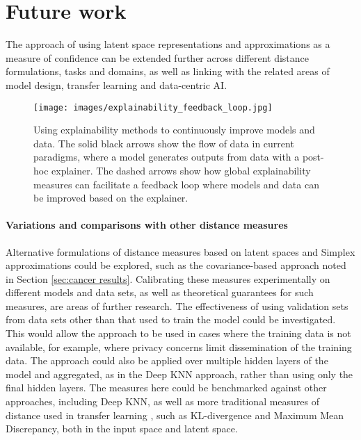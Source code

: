 \documentclass{article}
\begin{document}
\section{Future work}
\label{sec:future work}

The approach of using latent space representations and approximations as a measure of confidence can be extended further across different distance formulations, tasks and domains, as well as linking with the related areas of model design, transfer learning and data-centric AI.

\begin{figure}[ht]
  \centering
  \texttt{[image: images/explainability\_feedback\_loop.jpg]}
  \caption{Using explainability methods to continuously improve models and data. The solid black arrows show the flow of data in current paradigms, where a model generates outputs from data with a post-hoc explainer. The dashed arrows show how global explainability measures can facilitate a feedback loop where models and data can be improved based on the explainer.}
  \label{explainability_loop}
\end{figure}


\paragraph{Variations and comparisons with other distance measures}
Alternative formulations of distance measures based on latent spaces and Simplex approximations could be explored, such as the covariance-based approach noted in Section \ref{sec:cancer results}.
Calibrating these measures experimentally on different models and data sets, as well as theoretical guarantees for such measures, are areas of further research.
The effectiveness of using validation sets from data sets other than that used to train the model could be investigated. This would allow the approach to be used in cases where the training data is not available, for example, where privacy concerns limit dissemination of the training data.
The approach could also be applied over multiple hidden layers of the model and aggregated, as in the Deep KNN approach, rather than using only the final hidden layers. The measures here could be benchmarked against other approaches, including Deep KNN, as well as more traditional measures of distance used in transfer learning \cite{zhuang_comprehensive_2021}, such as KL-divergence and Maximum Mean Discrepancy, both in the input space and latent space.
\end{document}
